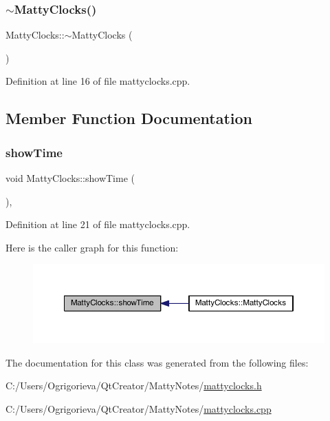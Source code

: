 \subsubsection{\texorpdfstring{$\sim$\+Matty\+Clocks()}{~MattyClocks()}}
{\footnotesize\ttfamily Matty\+Clocks\+::$\sim$\+Matty\+Clocks (\begin{DoxyParamCaption}{ }\end{DoxyParamCaption})}



Definition at line 16 of file mattyclocks.\+cpp.



\subsection{Member Function Documentation}
\hypertarget{classMattyClocks_a0104aa028d5bb73ca7fbbc1bf3488855}{}\label{classMattyClocks_a0104aa028d5bb73ca7fbbc1bf3488855} 
\subsubsection{\texorpdfstring{show\+Time}{showTime}}
{\footnotesize\ttfamily void Matty\+Clocks\+::show\+Time (\begin{DoxyParamCaption}{ }\end{DoxyParamCaption})\hspace{0.3cm}{\ttfamily [private]}, {\ttfamily [slot]}}



Definition at line 21 of file mattyclocks.\+cpp.

Here is the caller graph for this function\+:
\nopagebreak
\begin{figure}[H]
\begin{center}
\leavevmode
\includegraphics[width=350pt]{classMattyClocks_a0104aa028d5bb73ca7fbbc1bf3488855_icgraph}
\end{center}
\end{figure}


The documentation for this class was generated from the following files\+:\begin{DoxyCompactItemize}
\item 
C\+:/\+Users/\+Ogrigorieva/\+Qt\+Creator/\+Matty\+Notes/\hyperlink{mattyclocks_8h}{mattyclocks.\+h}\item 
C\+:/\+Users/\+Ogrigorieva/\+Qt\+Creator/\+Matty\+Notes/\hyperlink{mattyclocks_8cpp}{mattyclocks.\+cpp}\end{DoxyCompactItemize}
